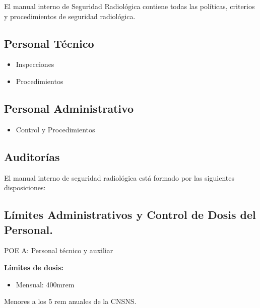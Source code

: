 El manual interno de Seguridad Radiológica contiene todas las políticas, criterios y procedimientos de seguridad radiológica.

\subsection*{Personal Técnico}
\begin{itemize}
    \item Inspecciones
    \item Procedimientos
\end{itemize}

\subsection*{Personal Administrativo}
\begin{itemize}
    \item Control y Procedimientos
\end{itemize}

\subsection*{Auditorías}

El manual interno de seguridad radiológica está formado por las siguientes disposiciones:

\subsection*{Límites Administrativos y Control de Dosis del Personal.}

POE A: Personal técnico y auxiliar

\textbf{Límites de dosis:}
\begin{itemize}
    \item Mensual: 400mrem
\end{itemize}

Menores a los 5 rem anuales de la CNSNS.
